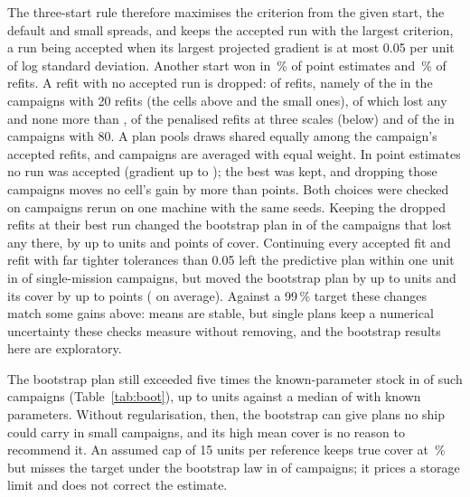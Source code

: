 The three-start rule therefore maximises the criterion from the given start,
the default and small spreads, and keeps the accepted run with the largest
criterion, a run being accepted when its largest projected gradient is at most
0.05 per unit of log standard deviation. Another start won in
\rlFitsWonPct\,\% of point estimates and \rlRestartedPct\,\% of refits. A
refit with no accepted run is dropped: \rlFailed{} of \rlRefits{} refits,
namely \rlRefMainFailed{} of the \rlRefMain{} in the \rlDropCampN{} campaigns
with 20 refits (the \cbCells{} cells above and the \rlAltOf{} small ones), of
which \rlDropCamp{} lost any and none more than \rlDropMax, \rlRefPenFailed{}
of the \rlRefPen{} penalised refits at three scales (below) and
\rlRefConvFailed{} of the \rlRefConv{} in \rlRefConvN{} campaigns with 80. A plan pools \rlDraws{} draws shared equally among the campaign's
accepted refits, and campaigns are averaged with equal weight. In
\rlFitsBad{} point estimates no run was accepted (gradient up to
\rlFitsBadGrad); the best was kept, and dropping those campaigns moves no
cell's gain by more than \rlFitsBadEffect{} points. Both choices were checked
on \rcN{} campaigns rerun on one machine with the same seeds. Keeping the
dropped refits at their best run changed the bootstrap plan in
\rcKeepChanged{} of the \rcKeepN{} campaigns that lost any there, by up to
\rcKeepUnitsMax{} units and \rcKeepCov{} points of cover. Continuing every
accepted fit and refit with far tighter tolerances than 0.05 left the
predictive plan within one unit in \rcPolPredOne{} of \rcPolN{} single-mission
campaigns, but moved the bootstrap plan by up to \rcPolBootMax{} units and its
cover by up to \rcPolCov{} points (\rcPolCovMean{} on average). Against a
99\,\% target these changes match some gains above: means are stable, but
single plans keep a numerical uncertainty these checks measure without
removing, and the bootstrap results here are exploratory.

The bootstrap plan still exceeded five times the known-parameter stock in
\rgBigN{} of \rgN{} such campaigns (Table~\ref{tab:boot}), up to \rgBigMax{}
units against a median of \rgOracleFive{} with known parameters. Without
regularisation, then, the bootstrap can give plans no ship could carry in
small campaigns, and its high mean cover is no reason to recommend it. An
assumed cap of 15 units per reference keeps true cover at \rgCapCov\,\% but
misses the target under the bootstrap law in \rgCapInfeas{} of \rgN{}
campaigns; it prices a storage limit and does not correct the estimate.

